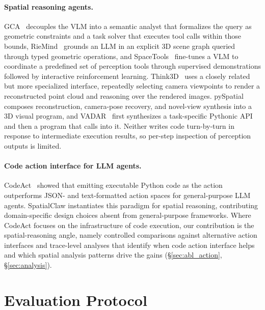 \documentclass{llmxive}
\providecommand{\ours}{SpatialClaw}
\begin{document}
\paragraph{Spatial reasoning agents.}
GCA~\citep{chen2025geometrically} decouples the VLM into a semantic analyst that formalizes the query as geometric constraints and a task solver that executes tool calls within those bounds, RieMind~\citep{ropero2026riemind} grounds an LLM in an explicit 3D scene graph queried through typed geometric operations, and SpaceTools~\citep{chen2025spacetools} fine-tunes a VLM to coordinate a predefined set of perception tools through supervised demonstrations followed by interactive reinforcement learning.
Think3D~\citep{zhang2026think3d} uses a closely related but more specialized interface, repeatedly selecting camera viewpoints to render a reconstructed point cloud and reasoning over the rendered images.
pySpatial~\citep{luo2026pyspatial} composes reconstruction, camera-pose recovery, and novel-view synthesis into a 3D visual program, and VADAR~\citep{marsili2025visual} first synthesizes a task-specific Pythonic API and then a program that calls into it.
Neither writes code turn-by-turn in response to intermediate execution results, so per-step inspection of perception outputs is limited.

\paragraph{Code action interface for LLM agents.}
CodeAct~\citep{wang2024executable} showed that emitting executable Python code as the action outperforms JSON- and text-formatted action spaces for general-purpose LLM agents.
\ours{} instantiates this paradigm for spatial reasoning, contributing domain-specific design choices absent from general-purpose frameworks.
Where CodeAct focuses on the infrastructure of code execution, our contribution is the spatial-reasoning angle, namely controlled comparisons against alternative action interfaces and trace-level analyses that identify when code action interface helps and which spatial analysis patterns drive the gains (\S\ref{sec:abl_action}, \S\ref{sec:analysis}).











\section{Evaluation Protocol}
\label{app:benchmarks}
\end{document}

